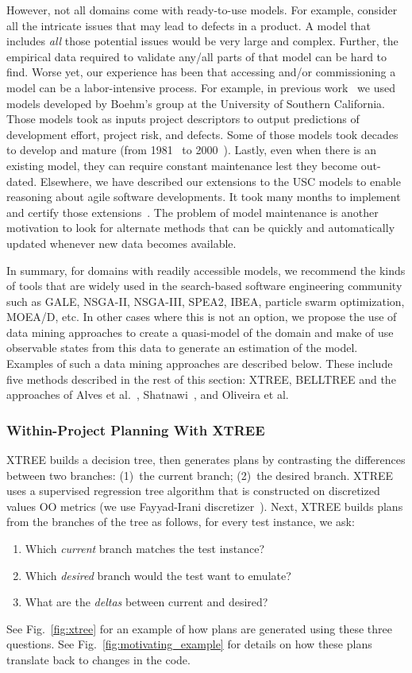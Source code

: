 \documentclass[10pt, journal, compsoc]{IEEEtran}
\newcommand{\be}{\begin{enumerate}}
\newcommand{\ee}{\end{enumerate}}
\newcommand{\fig}[1]{Fig.~\ref{fig:#1}}
\begin{document}
However, not all domains come with ready-to-use models. For example, consider all the intricate issues that may lead to defects in a product. A model that includes {\em all} those potential issues would be very large and complex. Further, the empirical data required to validate any/all parts of that model can be hard to find.
Worse yet, our experience has been that accessing and/or commissioning a model can be a labor-intensive process.
For example, in previous work~\cite{me07f} we used models developed by Boehm's group at the University of Southern California.
Those models took as inputs project descriptors to output predictions of development effort, project risk, and defects.
Some of those models took decades to develop and mature (from 1981~\cite{boehm81} to 2000~\cite{boehm00b}). 
Lastly, even when there is an existing model, they can require constant maintenance lest they become out-dated. Elsewhere, we have described our extensions to the USC models to enable reasoning about agile software developments. It took many months to implement and certify those extensions~\cite{me09i, me09j}. The problem of model maintenance is another motivation to look for alternate methods that can be quickly and automatically updated whenever new data becomes available.

In summary, for domains with readily accessible models, we recommend
the kinds of tools that are widely used in the search-based
software engineering community such as GALE, NSGA-II, NSGA-III, SPEA2, IBEA, particle swarm optimization, MOEA/D, etc. In other cases where this is not an option, we propose the use of data mining approaches to create a quasi-model of the domain and make of use observable states from this data to generate an estimation of the model. Examples of such a data mining approaches are described below.
These include five methods described in the rest of this section: XTREE, BELLTREE and the approaches of 
Alves et al.~\cite{alves}, Shatnawi~\cite{shatnawi}, and Oliveira et al.~\cite{oliveira} 



\subsubsection{Within-Project Planning With XTREE}
\label{sect:XTREE}


XTREE builds a decision tree, then generates
plans by contrasting the differences between two branches:
(1)~the current branch; (2)~the desired branch.
XTREE uses a supervised regression tree algorithm that is constructed on discretized values OO metrics (we use Fayyad-Irani discretizer~\cite{fi}). Next, XTREE builds plans from the branches of the tree as follows, for every test instance, we ask:
\be
\item
Which {\em current} branch matches the test instance?
\item Which {\em desired} branch would the test want to emulate?
\item What are the {\em deltas} between current and desired? 
\ee
See \fig{xtree} for an example of how plans are generated using these three questions.
See \fig{motivating_example} for details on how these plans translate back to changes in the code.
\end{document}
